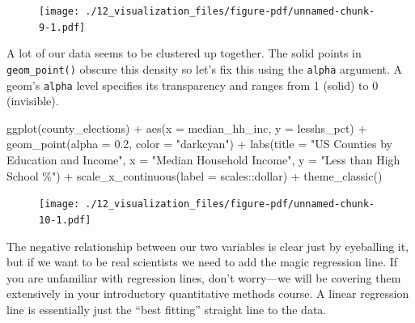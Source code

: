 \documentclass[
  letterpaper,
]{book}
\newenvironment{Shaded}{\begin{snugshade}}{\end{snugshade}}
\newcommand{\AttributeTok}[1]{\textcolor[rgb]{0.40,0.45,0.13}{#1}}
\newcommand{\FloatTok}[1]{\textcolor[rgb]{0.68,0.00,0.00}{#1}}
\newcommand{\FunctionTok}[1]{\textcolor[rgb]{0.28,0.35,0.67}{#1}}
\newcommand{\NormalTok}[1]{\textcolor[rgb]{0.00,0.23,0.31}{#1}}
\newcommand{\SpecialCharTok}[1]{\textcolor[rgb]{0.37,0.37,0.37}{#1}}
\newcommand{\StringTok}[1]{\textcolor[rgb]{0.13,0.47,0.30}{#1}}
\theoremstyle{definition}
\theoremstyle{definition}
\theoremstyle{plain}
\theoremstyle{definition}
\theoremstyle{plain}
\theoremstyle{plain}
\theoremstyle{remark}
\begin{document}
\begin{figure}[H]

{\centering \texttt{[image: ./12\_visualization\_files/figure-pdf/unnamed-chunk-9-1.pdf]}

}

\end{figure}

A lot of our data seems to be clustered up together. The solid points in
\texttt{geom\_point()} obscure this density so let's fix this using the
\texttt{alpha} argument. A geom's \texttt{alpha} level specifies its
transparency and ranges from 1 (solid) to 0 (invisible).

\begin{Shaded}
\begin{Highlighting}[]
\FunctionTok{ggplot}\NormalTok{(county\_elections) }\SpecialCharTok{+}
  \FunctionTok{aes}\NormalTok{(}\AttributeTok{x =}\NormalTok{ median\_hh\_inc, }\AttributeTok{y =}\NormalTok{ lesshs\_pct) }\SpecialCharTok{+}
  \FunctionTok{geom\_point}\NormalTok{(}\AttributeTok{alpha =} \FloatTok{0.2}\NormalTok{, }\AttributeTok{color =} \StringTok{"darkcyan"}\NormalTok{) }\SpecialCharTok{+}
  \FunctionTok{labs}\NormalTok{(}\AttributeTok{title =} \StringTok{"US Counties by Education and Income"}\NormalTok{,}
       \AttributeTok{x =} \StringTok{"Median Household Income"}\NormalTok{,}
       \AttributeTok{y =} \StringTok{"Less than High School \%"}\NormalTok{) }\SpecialCharTok{+}
  \FunctionTok{scale\_x\_continuous}\NormalTok{(}\AttributeTok{label =}\NormalTok{ scales}\SpecialCharTok{::}\NormalTok{dollar) }\SpecialCharTok{+}
  \FunctionTok{theme\_classic}\NormalTok{()}
\end{Highlighting}
\end{Shaded}

\begin{figure}[H]

{\centering \texttt{[image: ./12\_visualization\_files/figure-pdf/unnamed-chunk-10-1.pdf]}

}

\end{figure}

The negative relationship between our two variables is clear just by
eyeballing it, but if we want to be real scientists we need to add the
magic regression line. If you are unfamiliar with regression lines,
don't worry---we will be covering them extensively in your introductory
quantitative methods course. A linear regression line is essentially
just the ``best fitting'' straight line to the data.
\end{document}
